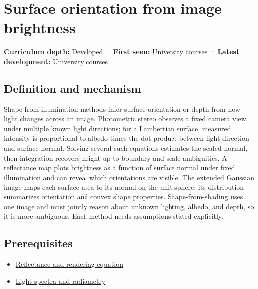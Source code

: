 \hypertarget{appendix-89b2d5b7c9e1}{}\label{referencestart:appendix-89b2d5b7c9e1}
\section{Surface orientation from image brightness}\label{appendix-89b2d5b7c9e1-surface-orientation-from-image-brightness}

\textbf{Curriculum depth:} Developed · \textbf{First seen:} University courses · \textbf{Latest development:} University courses

\begin{allmightroledefinition}

\subsection{Definition and mechanism}\label{appendix-89b2d5b7c9e1-definition-and-mechanism}

Shape-from-illumination methods infer surface orientation or depth from how light changes across an image. Photometric stereo observes a fixed camera view under multiple known light directions; for a Lambertian surface, measured intensity is proportional to albedo times the dot product between light direction and surface normal. Solving several such equations estimates the scaled normal, then integration recovers height up to boundary and scale ambiguities. A reflectance map plots brightness as a function of surface normal under fixed illumination and can reveal which orientations are visible. The extended Gaussian image maps each surface area to its normal on the unit sphere; its distribution summarizes orientation and convex shape properties. Shape-from-shading uses one image and must jointly reason about unknown lighting, albedo, and depth, so it is more ambiguous. Each method needs assumptions stated explicitly.

\end{allmightroledefinition}

\subsection{Prerequisites}\label{appendix-89b2d5b7c9e1-prerequisites}

\begin{itemize}
\tightlist
\item
  \hyperref[appendix-96da0b153b77]{Reflectance and rendering equation}
\item
  \hyperref[appendix-215c2570199b]{Light spectra and radiometry}
\end{itemize}

